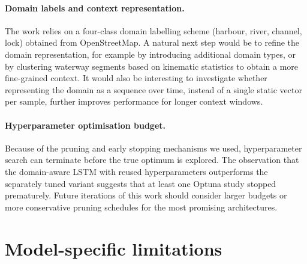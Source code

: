 \paragraph{Domain labels and context representation.}
The work relies on a four-class domain labelling scheme (harbour, river, channel, lock) obtained from OpenStreetMap. %
A natural next step would be to refine the domain representation, for example by introducing additional domain types, or by clustering waterway segments based on kinematic statistics to obtain a more fine-grained context. It would also be interesting to investigate whether representing the domain as a sequence over time, instead of a single static vector per sample, further improves performance for longer context windows.

\paragraph{Hyperparameter optimisation budget.}
Because of the pruning and early stopping mechanisms we used, hyperparameter search can terminate before the true optimum is explored. The observation that the domain-aware LSTM with reused hyperparameters outperforms the separately tuned variant suggests that at least one Optuna study stopped prematurely. Future iterations of this work should consider larger budgets or more conservative pruning schedules for the most promising architectures.



\section{Model-specific limitations}

